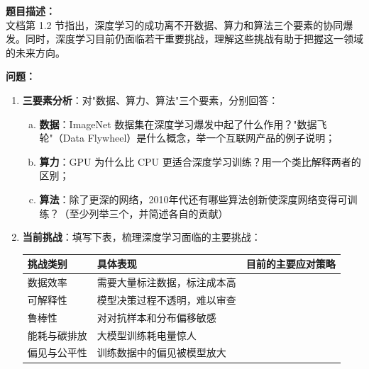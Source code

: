 \documentclass[a4paper,11pt]{ctexart}
\begin{document}
\begin{problembox}
    \textbf{题目描述：}\\
    文档第 1.2 节指出，深度学习的成功离不开数据、算力和算法三个要素的协同爆发。同时，深度学习目前仍面临若干重要挑战，理解这些挑战有助于把握这一领域的未来方向。

    \vspace{0.3cm}
    \textbf{问题：}
    \begin{enumerate}[(1)]
        \item \textbf{三要素分析}：对"数据、算力、算法"三个要素，分别回答：
        \begin{enumerate}[a.]
            \item \textbf{数据}：ImageNet 数据集在深度学习爆发中起了什么作用？"数据飞轮"（Data Flywheel）是什么概念，举一个互联网产品的例子说明；
            \item \textbf{算力}：GPU 为什么比 CPU 更适合深度学习训练？用一个类比解释两者的区别；
            \item \textbf{算法}：除了更深的网络，2010年代还有哪些算法创新使深度网络变得可训练？（至少列举三个，并简述各自的贡献）
        \end{enumerate}

        \item \textbf{当前挑战}：填写下表，梳理深度学习面临的主要挑战：

        \begin{center}
        \begin{tabular}{p{2.5cm} p{4.0cm} p{4.5cm}}
            \toprule
            挑战类别 & 具体表现 & 目前的主要应对策略 \\
            \midrule
            数据效率 & 需要大量标注数据，标注成本高 & \underline{\hspace{4.0cm}} \\[1.5em]
            可解释性 & 模型决策过程不透明，难以审查 & \underline{\hspace{4.0cm}} \\[1.5em]
            鲁棒性 & 对对抗样本和分布偏移敏感 & \underline{\hspace{4.0cm}} \\[1.5em]
            能耗与碳排放 & 大模型训练耗电量惊人 & \underline{\hspace{4.0cm}} \\[1.5em]
            偏见与公平性 & 训练数据中的偏见被模型放大 & \underline{\hspace{4.0cm}} \\
            \bottomrule
        \end{tabular}
        \end{center}


\end{enumerate}
\end{problembox}
\end{document}
